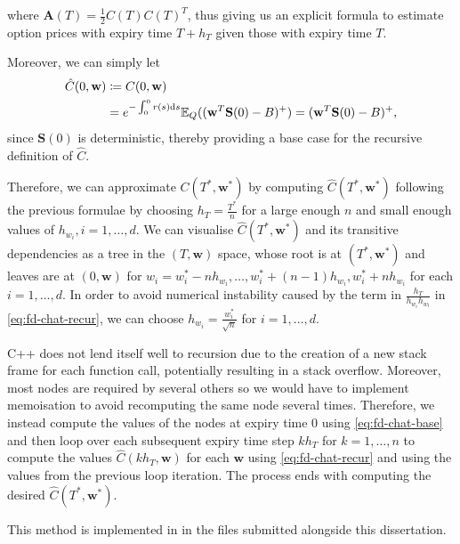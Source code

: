 \documentclass[english]{article}
\newcommand{\comment}[1]{\color{blue}#1\color{black}}
\numberwithin{equation}{section}
\numberwithin{figure}{section}
\theoremstyle{bolddescit}
\theoremstyle{definition}
\theoremstyle{definition}
\theoremstyle{plain}
\theoremstyle{plain}
\theoremstyle{bolddesc}
\theoremstyle{plain}
\theoremstyle{remark}
\begin{document}
where $\mathbf{A}(T) = \frac{1}{2} C(T) C(T)^T$, thus giving us an explicit formula to estimate option prices with expiry time $T+h_T$ given those with expiry time $T$.

Moreover, we can simply let
\begin{align}
  \hat{C}(0, \mathbf{w})
  &\coloneq C(0, \mathbf{w})\notag\\
  &= e^{-\int_0^0 r(s) \mathrm{d}s} \mathbb{E}_Q((\mathbf{w}^T \mathbf{S}(0) - B)^+)
  = (\mathbf{w}^T \mathbf{S}(0) - B)^+,\label{eq:fd-chat-base}
\end{align}
since $\mathbf{S}(0)$ is deterministic, thereby providing a base case for the recursive definition of $\hat{C}$.

Therefore, we can approximate $C(T^*, \mathbf{w}^*)$ by computing $\hat{C}(T^*, \mathbf{w}^*)$ following the previous formulae by choosing $h_T = \frac{T^*}{n}$ for a large enough $n$ and small enough values of $h_{w_i}, i=1,\ldots,d$. We can visualise $\hat{C}(T^*, \mathbf{w}^*)$ and its transitive dependencies as a tree in the $(T,\mathbf{w})$ space, whose root is at $(T^*, \mathbf{w}^*)$ and leaves are at $(0,\mathbf{w})$ for $w_i = w_i^* - n h_{w_i}, \ldots, w_i^* + (n-1) h_{w_i}, w_i^* + n h_{w_i}$ for each $i=1,\ldots,d$. In order to avoid numerical instability caused by the term in $\frac{h_T}{h_{w_i} h_{w_l}}$ in \eqref{eq:fd-chat-recur}, we can choose $h_{w_i} = \frac{w_i^*}{\sqrt{n}}$ for $i=1,\ldots,d$.

C++ does not lend itself well to recursion due to the creation of a new stack frame for each function call, potentially resulting in a stack overflow. Moreover, most nodes are required by several others so we would have to implement memoisation to avoid recomputing the same node several times.
Therefore, we instead compute the values of the nodes at expiry time 0 using \eqref{eq:fd-chat-base} and then loop over each subsequent expiry time step $k h_T$ for $k=1,\ldots,n$ to compute the values $\hat{C}(k h_T, \mathbf{w})$ for each $\mathbf{w}$ using \eqref{eq:fd-chat-recur} and using the values from the previous loop iteration. The process ends with computing the desired $\hat{C}(T^*, \mathbf{w}^*)$.

This method is implemented in  in the files submitted alongside this dissertation.
\end{document}
